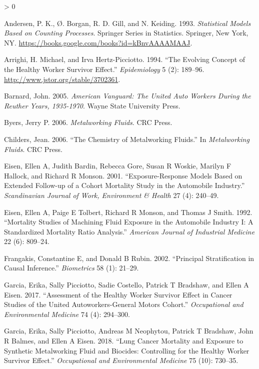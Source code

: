 \documentclass[
  11pt,
]{article}
\newlength{\cslhangindent}
\newenvironment{CSLReferences}[2] %
 {%
  \setlength{\parindent}{0pt}
  \ifodd #1 \everypar{\setlength{\hangindent}{\cslhangindent}}\ignorespaces\fi
  \ifnum #2 > 0
  \setlength{\parskip}{#2\baselineskip}
  \fi
 }%
 {}
\begin{document}
\hypertarget{refs}{}
\begin{CSLReferences}{1}{0}
\leavevmode\hypertarget{ref-Andersen_1993}{}%
Andersen, P. K., Ø. Borgan, R. D. Gill, and N. Keiding. 1993.
\emph{Statistical Models Based on Counting Processes}. Springer Series
in Statistics. Springer, New York, NY.
\url{https://books.google.com/books?id=kBnvAAAAMAAJ}.

\leavevmode\hypertarget{ref-Arrighi_1994}{}%
Arrighi, H. Michael, and Irva Hertz-Picciotto. 1994. {``The Evolving
Concept of the Healthy Worker Survivor Effect.''} \emph{Epidemiology} 5
(2): 189--96. \url{http://www.jstor.org/stable/3702361}.

\leavevmode\hypertarget{ref-Barnard_2005}{}%
Barnard, John. 2005. \emph{American Vanguard: The United Auto Workers
During the Reuther Years, 1935-1970}. Wayne State University Press.

\leavevmode\hypertarget{ref-Byers_2006}{}%
Byers, Jerry P. 2006. \emph{Metalworking Fluids}. CRC Press.

\leavevmode\hypertarget{ref-Childers_2006}{}%
Childers, Jean. 2006. {``The Chemistry of Metalworking Fluids.''} In
\emph{Metalworking Fluids}. CRC Press.

\leavevmode\hypertarget{ref-Eisen_2001}{}%
Eisen, Ellen A, Judith Bardin, Rebecca Gore, Susan R Woskie, Marilyn F
Hallock, and Richard R Monson. 2001. {``Exposure-Response Models Based
on Extended Follow-up of a Cohort Mortality Study in the Automobile
Industry.''} \emph{Scandinavian Journal of Work, Environment \& Health}
27 (4): 240--49.

\leavevmode\hypertarget{ref-Eisen_1992}{}%
Eisen, Ellen A, Paige E Tolbert, Richard R Monson, and Thomas J Smith.
1992. {``Mortality Studies of Machining Fluid Exposure in the Automobile
Industry {I}: A Standardized Mortality Ratio Analysis.''} \emph{American
Journal of Industrial Medicine} 22 (6): 809--24.

\leavevmode\hypertarget{ref-Frangakis_2002}{}%
Frangakis, Constantine E, and Donald B Rubin. 2002. {``Principal
Stratification in Causal Inference.''} \emph{Biometrics} 58 (1): 21--29.

\leavevmode\hypertarget{ref-Garcia_2017}{}%
Garcia, Erika, Sally Picciotto, Sadie Costello, Patrick T Bradshaw, and
Ellen A Eisen. 2017. {``Assessment of the Healthy Worker Survivor Effect
in Cancer Studies of the United Autoworkers-General Motors Cohort.''}
\emph{Occupational and Environmental Medicine} 74 (4): 294--300.

\leavevmode\hypertarget{ref-Garcia_2018}{}%
Garcia, Erika, Sally Picciotto, Andreas M Neophytou, Patrick T Bradshaw,
John R Balmes, and Ellen A Eisen. 2018. {``Lung Cancer Mortality and
Exposure to Synthetic Metalworking Fluid and Biocides: Controlling for
the Healthy Worker Survivor Effect.''} \emph{Occupational and
Environmental Medicine} 75 (10): 730--35.


\end{CSLReferences}
\end{document}

